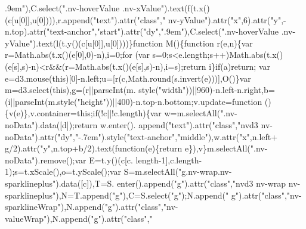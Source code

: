 \begin{DoxyCode}
{      .9em"}),C.select(\textcolor{stringliteral}{".nv-hoverValue .nv-xValue"}).text(f(t.x()(c[u[0]],u[0]))),r.append(\textcolor{stringliteral}{"text"}).attr(\textcolor{stringliteral}{"class"},\textcolor{stringliteral}{"
      nv-yValue"}).attr(\textcolor{stringliteral}{"x"},6).attr(\textcolor{stringliteral}{"y"},-n.top).attr(\textcolor{stringliteral}{"text-anchor"},\textcolor{stringliteral}{"start"}).attr(\textcolor{stringliteral}{"dy"},\textcolor{stringliteral}{".9em"}),C.select(\textcolor{stringliteral}{".nv-hoverValue
       .nv-yValue"}).text(l(t.y()(c[u[0]],u[0])))\}\textcolor{keyword}{function} M()\{\textcolor{keyword}{function} r(e,n)\{var r=Math.abs(t.x()(e[0],0)-n),i=0;\textcolor{keywordflow}{for}
      (var s=0;s<e.length;s++)Math.abs(t.x()(e[s],s)-n)<r&&(r=Math.abs(t.x()(e[s],s)-n),i=s);\textcolor{keywordflow}{return} i\}\textcolor{keywordflow}{if}(a)\textcolor{keywordflow}{return};
      var e=d3.mouse(\textcolor{keyword}{this})[0]-n.left;u=[r(c,Math.round(s.invert(e)))],O()\}var m=d3.select(\textcolor{keyword}{this}),g=(r||parseInt(m.
      style(\textcolor{stringliteral}{"width"}))||960)-n.left-n.right,b=(i||parseInt(m.style(\textcolor{stringliteral}{"height"}))||400)-n.top-n.bottom;v.update=\textcolor{keyword}{function}
      ()\{v(e)\},v.container=\textcolor{keyword}{this};\textcolor{keywordflow}{if}(!c||!c.length)\{var w=m.selectAll(\textcolor{stringliteral}{".nv-noData"}).data([d]);\textcolor{keywordflow}{return} w.enter().
      append(\textcolor{stringliteral}{"text"}).attr(\textcolor{stringliteral}{"class"},\textcolor{stringliteral}{"nvd3 nv-noData"}).attr(\textcolor{stringliteral}{"dy"},\textcolor{stringliteral}{"-.7em"}).style(\textcolor{stringliteral}{"text-anchor"},\textcolor{stringliteral}{"middle"}),w.attr(\textcolor{stringliteral}{"x"},n.left+
      g/2).attr(\textcolor{stringliteral}{"y"},n.top+b/2).text(\textcolor{keyword}{function}(e)\{\textcolor{keywordflow}{return} e\}),v\}m.selectAll(\textcolor{stringliteral}{".nv-noData"}).remove();var E=t.y()(c[c.
      length-1],c.length-1);s=t.xScale(),o=t.yScale();var S=m.selectAll(\textcolor{stringliteral}{"g.nv-wrap.nv-sparklineplus"}).data([c]),T=S.
      enter().append(\textcolor{stringliteral}{"g"}).attr(\textcolor{stringliteral}{"class"},\textcolor{stringliteral}{"nvd3 nv-wrap nv-sparklineplus"}),N=T.append(\textcolor{stringliteral}{"g"}),C=S.select(\textcolor{stringliteral}{"g"});N.append(\textcolor{stringliteral}{"
      g"}).attr(\textcolor{stringliteral}{"class"},\textcolor{stringliteral}{"nv-sparklineWrap"}),N.append(\textcolor{stringliteral}{"g"}).attr(\textcolor{stringliteral}{"class"},\textcolor{stringliteral}{"nv-valueWrap"}),N.append(\textcolor{stringliteral}{"g"}).attr(\textcolor{stringliteral}{"class"},\textcolor{stringliteral}{"
}
\end{DoxyCode}

